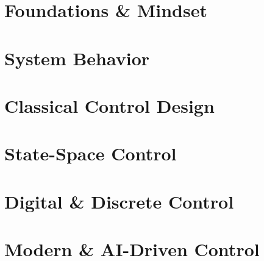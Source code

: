 \documentclass[12pt,twoside]{book}
\theoremstyle{definition}
\theoremstyle{plain}
\begin{document}
\part{Foundations \& Mindset}






\part{System Behavior}






\part{Classical Control Design}








\part{State-Space Control}






\part{Digital \& Discrete Control}




\part{Modern \& AI-Driven Control}








\backmatter



\end{document}
